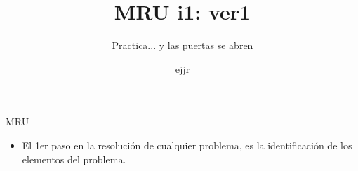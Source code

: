 \documentclass[%
final,
total,
slideBW,
colorBG,
pdf,
accumulate,
]{prosper}
\title{MRU i1: ver1}
\subtitle{Practica... y las puertas se abren}
\author{ejjr}
\begin{document}
\maketitle



\begin{slide}{MRU}
% 
 


 
\begin{itemize}                                                              

\item El 1er paso en la resoluci\'on de cualquier problema, es la
identificaci\'on de los elementos del problema.            
              
\end{itemize}

\end{slide}




\end{document}
